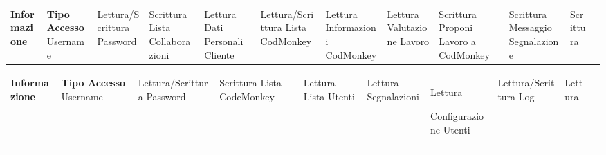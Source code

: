 \begin{center}
    \begin{tabularx}
        {\textwidth} {|X|X|}
        \hline  {}
        \n      {}
        \large \textbf{Informazione}  & \centering\large\textbf{Tipo Accesso}
        \n                   Username & Lettura/Scrittura
        \n            Password        & Scrittura
        \n     Lista Collaborazioni   & Lettura
        \n     Dati Personali Cliente & Lettura/Scrittura
        \n     Lista CodMonkey        & Lettura
        \n     Informazioni CodMonkey & Lettura
        \n    Valutazione Lavoro      & Scrittura
        \n Proponi Lavoro a CodMonkey & Scrittura
        \n   Messaggio Segnalazione   & Scrittura
        \n
    \end{tabularx}
    \label{tab:monkeytable:problema:tabellafmeiageahjnaijgnaij}


    \phantom{M}%


    \begin{tabularx}
        {\textwidth} {|X|X|}
        \hline  {}
        \n      {}
        \large \textbf{Informazione}       & \centering\large\textbf{Tipo Accesso}
        \n            Username             & Lettura/Scrittura
        \n            Password             & Scrittura
        \n Lista CodeMonkey                & Lettura
        \n Lista Utenti                    & Lettura
        \n    Segnalazioni                 & Lettura

        \n           Configurazione Utenti & Lettura/Scrittura
        \n     Log                         & Lettura
        \n
    \end{tabularx}
    \label{tab:monkeytable:problema:tabellafmeiageahjnaijgnaij}




\end{center}
